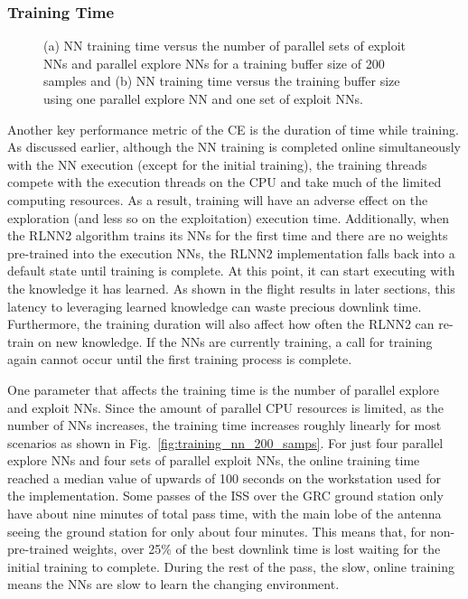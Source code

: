 \documentclass[journal]{IEEEtran}
\let\MYoriglatexcaption\caption
\renewcommand{\caption}[2][\relax]{\MYoriglatexcaption[#2]{#2}}
\begin{document}
\subsubsection{Training Time}
\begin{figure*}[t]
	\centering
 	\hfill
 	\caption{(a) NN training time versus the number of parallel sets of exploit NNs and parallel explore NNs for a training buffer size of 200 samples and (b) NN training time versus the training buffer size using one parallel explore NN and one set of exploit NNs.}
\label{fig:training_time_test}
\end{figure*}

Another key performance metric of the CE is the duration of time while training.  As discussed earlier, although the NN training is completed online simultaneously with the NN execution (except for the initial training), the training threads compete with the execution threads on the CPU and take much of the limited computing resources.  As a result, training will have an adverse effect on the exploration (and less so on the exploitation) execution time.  Additionally, when the RLNN2 algorithm trains its NNs for the first time and there are no weights pre-trained into the execution NNs, the RLNN2 implementation falls back into a default state until training is complete.  At this point, it can start executing with the knowledge it has learned.  As shown in the flight results in later sections, this latency to leveraging learned knowledge can waste precious downlink time.  Furthermore, the training duration will also affect how often the RLNN2 can re-train on new knowledge.  If the NNs are currently training, a call for training again cannot occur until the first training process is complete.

One parameter that affects the training time is the number of parallel explore and exploit NNs.  Since the amount of parallel CPU resources is limited, as the number of NNs increases, the training time increases roughly linearly for most scenarios as shown in Fig.~\ref{fig:training_nn_200_samps}.  For just four parallel explore NNs and four sets of parallel exploit NNs, the online training time reached a median value of upwards of 100 seconds on the workstation used for the implementation.  Some passes of the ISS over the GRC ground station only have about nine minutes of total pass time, with the main lobe of the antenna seeing the ground station for only about four minutes.  This means that, for non-pre-trained weights, over 25\% of the best downlink time is lost waiting for the initial training to complete.  During the rest of the pass, the slow, online training means the NNs are slow to learn the changing environment.
\end{document}
